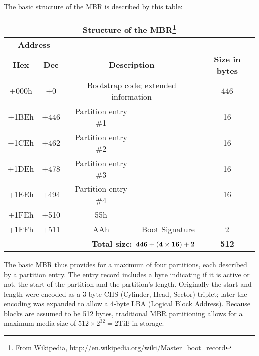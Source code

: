 \documentclass[11pt,letter]{book}
\begin{document}
The basic structure of the MBR is described by this table:

\begin{minipage}{\textwidth}
\begin{tabular}{|c|c|c|c|c|}
\multicolumn{5}{c}{\bf Structure of the MBR\footnote{From Wikipedia, \url{http://en.wikipedia.org/wiki/Master_boot_record}}}\\
\hline
\multicolumn{2}{|c|}{\bf Address} & \multicolumn{2}{c|}{}                              & \\
\cline{1-2} \bf Hex & \bf Dec         & \multicolumn{2}{c|}{\multirow{-2}{*}{\bf Description}} & \multirow{-2}{*}{\bf Size in bytes}\\
\hline
+000h & +0   & \multicolumn{2}{c|}{Bootstrap code; extended information} & 446 \\
\cline{3-4}
+1BEh & +446 & Partition entry \#1 && 16 \\
+1CEh & +462 & Partition entry \#2 && 16 \\
+1DEh & +478 & Partition entry \#3 && 16 \\
+1EEh & +494 & Partition entry \#4 && 16 \\
\hline
+1FEh & +510 & 55h & & \\
\cline{1-3}
+1FFh & +511 & AAh & \multirow{-2}{*}{Boot Signature} & \multirow{-2}{*}{2} \\
\hline
\hline
\multicolumn{4}{|r|}{\textbf{Total size: $\bf 446 + (4\times16) + 2 $}} & \textbf{512}\\
\hline
\end{tabular}
\end{minipage}

The basic MBR thus provides for a maximum of four partitions, each
described by a partition entry. The entry record includes a byte
indicating if it is active or not, the start of the partition and the
partition's length.  Originally the start and length were encoded as a 
3-byte CHS (Cylinder, Head, Sector) triplet; later the encoding was
expanded to allow a 4-byte LBA (Logical Block
Address). Because blocks
are assumed to be 512 bytes, traditional MBR partitioning allows for a
maximum media size of $512 \times 2^{32}=2\textrm{TiB}$ in storage.
\end{document}
